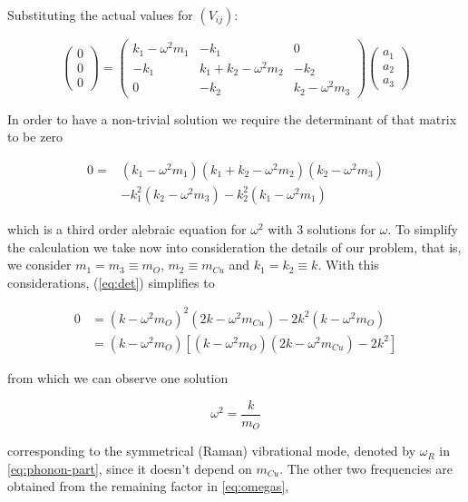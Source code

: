 Substituting the actual values for $(V_{ij})$:

\begin{equation}
  \left( 
    \begin{array}{c}
      0\\ 0\\ 0
    \end{array}
  \right) 
  = \left(
    \begin{array}{ccc}
      k_1-\omega^2m_1 & -k_1 & 0 \\ -k_1 & k_1+k_2-\omega^2m_2 & -k_2 \\ 0 & -k_2 & k_2-\omega^2m_3 
    \end{array}
  \right) 
  \left(
    \begin{array}{c}
      a_1 \\ a_2 \\ a_3 
    \end{array}
  \right)
\end{equation}

In order to have a non-trivial solution we require the determinant of that matrix to be zero

\begin{equation}
  \label{eq:det}
  \begin{split}
    0 = & (k_1-\omega^2m_1)(k_1+k_2-\omega^2m_2)(k_2-\omega^2m_3) \\
        & -k_1^2(k_2-\omega^2m_3)-k_2^2(k_1-\omega^2m_1)
  \end{split}
\end{equation}

\noindent which is a third order alebraic equation for $\omega^2$ with 3 solutions for $\omega$.
To simplify the calculation we take now into consideration the details of our problem, that is, we consider $m_1 = m_3 \equiv m_O$, $m_2 \equiv m_{Cu}$ and $k_1 = k_2 \equiv k$. 
With this considerations, (\ref{eq:det}) simplifies to

\begin{align}
  \label{eq:omegas}
  0 & = (k-\omega^2m_O)^2(2k-\omega^2m_{Cu})-2k^2(k-\omega^2m_O) \\
    & = (k-\omega^2m_O)[(k-\omega^2m_O)(2k-\omega^2m_{Cu})-2k^2]
\end{align}

\noindent from which we can observe one solution

\begin{equation}
  \omega^2= \frac{k}{m_O}
\end{equation}

\noindent corresponding to the symmetrical (Raman) vibrational mode, denoted by $\omega_{R}$ in \ref{eq:phonon-part}, since it doesn't depend on $m_{Cu}$.
The other two frequencies are obtained from the remaining factor in \ref{eq:omegas},

